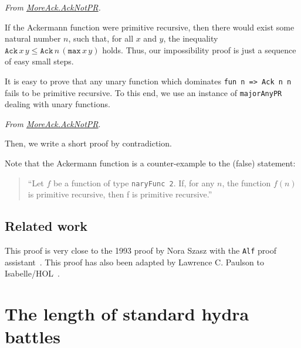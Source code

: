\vspace{4pt}
\noindent
\emph{From \href{../theories/html/hydras.MoreAck.AckNotPR.html}{MoreAck.AckNotPR}.}






If the Ackermann function were primitive recursive, then there would exist some natural number $n$, such that, for all $x$ and $y$, the inequality 
$\texttt{Ack}\,x\,y\leq \texttt{Ack}\,n\,(\texttt{max}\,x\,y)$ holds.
Thus, our impossibility proof is just a sequence of easy small steps.



\begin{remark}
It is easy to prove that any unary function which dominates \texttt{fun n => Ack n n} fails to be primitive recursive. To this end, we use an instance of \texttt{majorAnyPR} dealing with unary functions.

\vspace{4pt}
\noindent

\emph{From \href{../theories/html/hydras.MoreAck.AckNotPR.html}{MoreAck.AckNotPR}}.



Then, we write  a short proof by contradiction.



\end{remark}

\begin{remark}
Note that the Ackermann function is a counter-example to the (false) statement:
\begin{quote}
{\color{red}
  ``Let $f$ be a function of type \texttt{naryFunc\,2}. If, for any $n$, the function $f(n)$ is primitive recursive, then f is primitive recursive.''}
\end{quote}
\end{remark}

\subsection{Related work}

This proof is very close to the 1993 proof by Nora Szasz with the \texttt{Alf} proof assistant~\cite{Szasz93}. This proof has also been adapted
by Lawrence C. Paulson to Isabelle/HOL~\cite{paulson_2021}.

\section{The length of standard hydra battles}
\label{sect:battle-length-notPR}

